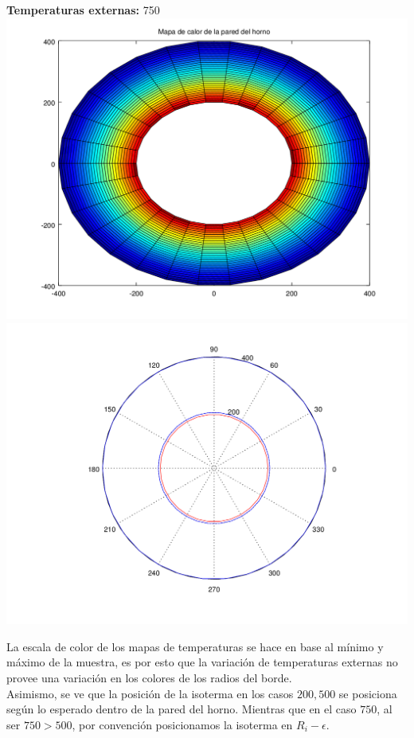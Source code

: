 	\textbf{Temperaturas externas: } 750\\
	\includegraphics[scale=0.35]{experimentos1a_1b/evolucion_isoterma_cambios_temperatura_varias_discretizaciones/test23_030_radios_030_angulos_inst_001_heatmap.png}
	\includegraphics[scale=0.35]{experimentos1a_1b/evolucion_isoterma_cambios_temperatura_varias_discretizaciones/test23_030_radios_030_angulos_inst_001_isomap.png}

\vspace{0.5cm}

La escala de color de los mapas de temperaturas se hace en base al mínimo y máximo de la muestra, es por esto que la variación de temperaturas externas no provee una variación en los colores de los radios del borde. \\
Asimismo, se ve que la posición de la isoterma en los casos $200, 500$ se posiciona según lo esperado dentro de la pared del horno. Mientras que en el caso $750$, al ser $750 > 500$, por convención posicionamos la isoterma en $R_i - \epsilon$.

